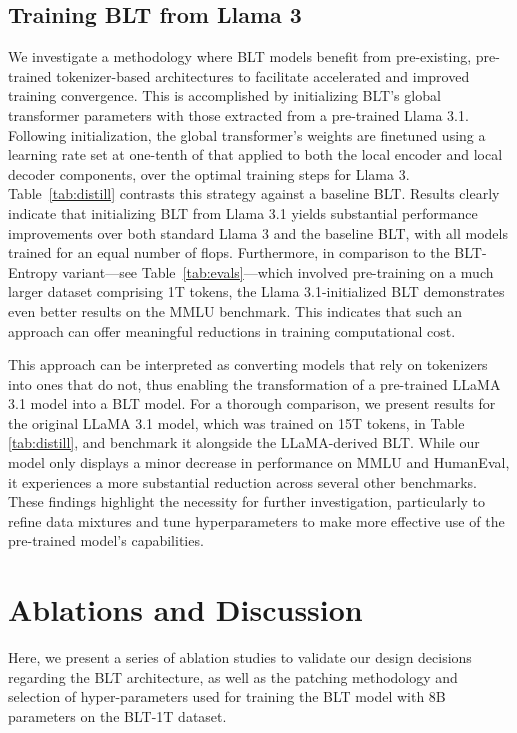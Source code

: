 \subsection{Training {\textsc BLT} from Llama 3}
\label{sec:distillation}
We investigate a methodology where {\textsc BLT} models benefit from pre-existing, pre-trained tokenizer-based architectures to facilitate accelerated and improved training convergence. This is accomplished by initializing {\textsc BLT}'s global transformer parameters with those extracted from a pre-trained Llama 3.1. Following initialization, the global transformer’s weights are finetuned using a learning rate set at one-tenth of that applied to both the local encoder and local decoder components, over the optimal training steps for Llama 3. Table~\ref{tab:distill} contrasts this strategy against a baseline {\textsc BLT}. Results clearly indicate that initializing {\textsc BLT} from Llama 3.1 yields substantial performance improvements over both standard Llama 3 and the baseline {\textsc BLT}, with all models trained for an equal number of flops. Furthermore, in comparison to the {\textsc BLT}-Entropy variant—see Table~\ref{tab:evals}—which involved pre-training on a much larger dataset comprising 1T tokens, the Llama 3.1-initialized {\textsc BLT} demonstrates even better results on the MMLU benchmark. This indicates that such an approach can offer meaningful reductions in training computational cost.

This approach can be interpreted as converting models that rely on tokenizers into ones that do not, thus enabling the transformation of a pre-trained LLaMA 3.1 model into a {\textsc BLT} model. For a thorough comparison, we present results for the original LLaMA 3.1 model, which was trained on 15T tokens, in Table \ref{tab:distill}, and benchmark it alongside the LLaMA-derived {\textsc BLT}. While our model only displays a minor decrease in performance on MMLU and HumanEval, it experiences a more substantial reduction across several other benchmarks. These findings highlight the necessity for further investigation, particularly to refine data mixtures and tune hyperparameters to make more effective use of the pre-trained model’s capabilities.

\section{Ablations and Discussion}
\label{section:ablations}
Here, we present a series of ablation studies to validate our design decisions regarding the {\textsc BLT} architecture, as well as the patching methodology and selection of hyper-parameters used for training the {\textsc BLT} model with 8B parameters on the {\textsc BLT}-1T dataset.

